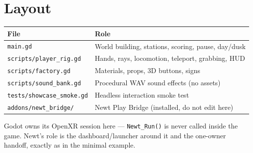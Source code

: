 \documentclass[11pt]{article}
\begin{document}
\section{Layout}
\label{sec:org146445d}
\begin{center}
\begin{tabular}{ll}
File & Role\\
\hline
\texttt{main.gd} & World building, stations, scoring, pause, day/dusk\\
\texttt{scripts/player\_rig.gd} & Hands, rays, locomotion, teleport, grabbing, HUD\\
\texttt{scripts/factory.gd} & Materials, props, 3D buttons, signs\\
\texttt{scripts/sound\_bank.gd} & Procedural WAV sound effects (no assets)\\
\texttt{tests/showcase\_smoke.gd} & Headless interaction smoke test\\
\texttt{addons/newt\_bridge/} & Newt Play Bridge (installed, do not edit here)\\
\end{tabular}
\end{center}

Godot owns its OpenXR session here — \texttt{Newt\_Run()} is never called inside
the game. Newt's role is the dashboard/launcher around it and the
one-owner handoff, exactly as in the minimal example.
\end{document}
